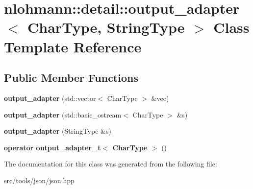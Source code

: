 \hypertarget{classnlohmann_1_1detail_1_1output__adapter}{}\section{nlohmann\+:\+:detail\+:\+:output\+\_\+adapter$<$ Char\+Type, String\+Type $>$ Class Template Reference}
\label{classnlohmann_1_1detail_1_1output__adapter}
\subsection*{Public Member Functions}
\begin{DoxyCompactItemize}
\item 
\mbox{\label{classnlohmann_1_1detail_1_1output__adapter_a05a30a77b568fd84676078d938cbd484}} 
{\bfseries output\+\_\+adapter} (std\+::vector$<$ Char\+Type $>$ \&vec)
\item 
\mbox{\label{classnlohmann_1_1detail_1_1output__adapter_a43b3ba852e6a2c3f4d312543bb04c00d}} 
{\bfseries output\+\_\+adapter} (std\+::basic\+\_\+ostream$<$ Char\+Type $>$ \&s)
\item 
\mbox{\label{classnlohmann_1_1detail_1_1output__adapter_a6ad59d1ec534383b430cd7ef8a518539}} 
{\bfseries output\+\_\+adapter} (String\+Type \&s)
\item 
\mbox{\label{classnlohmann_1_1detail_1_1output__adapter_a5fdac7aec8ade2f4bb0b5df30550d90c}} 
{\bfseries operator output\+\_\+adapter\+\_\+t$<$ Char\+Type $>$} ()
\end{DoxyCompactItemize}


The documentation for this class was generated from the following file\+:\begin{DoxyCompactItemize}
\item 
src/tools/json/json.\+hpp\end{DoxyCompactItemize}
